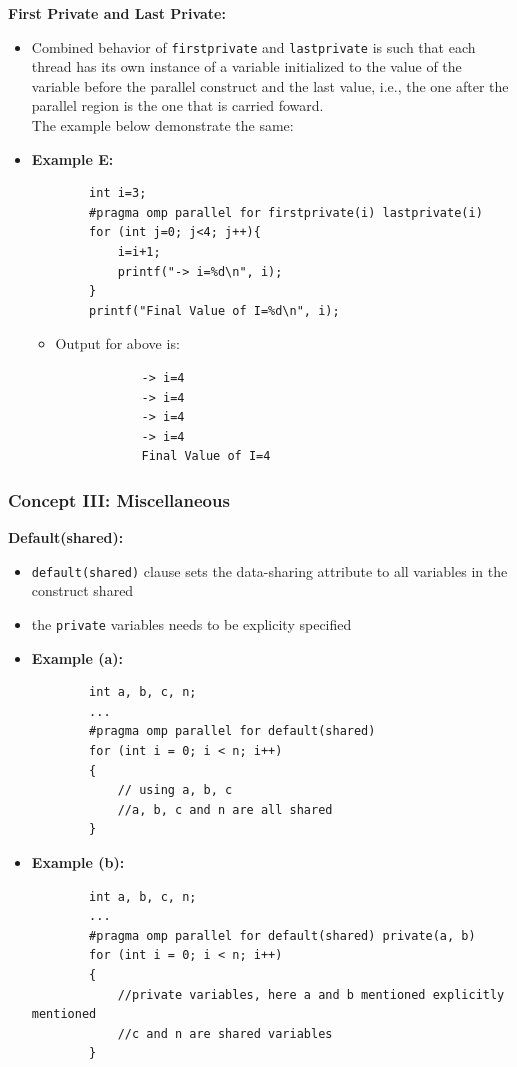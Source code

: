 \documentclass[12pt, a4paper]{report}
\begin{document}
{\bfseries{First Private and Last Private:}}
\begin{itemize}
    \item Combined behavior of \verb$firstprivate$ and \verb$lastprivate$ is such that each thread has its own instance of a variable initialized
          to the value of the variable before the parallel construct and the last value, i.e., the one after the parallel region is the one that 
          is carried foward.\\
          The example below demonstrate the same:
    \item {\bfseries{Example E:}}
    \begin{verbatim}
        int i=3;
        #pragma omp parallel for firstprivate(i) lastprivate(i)
        for (int j=0; j<4; j++){ 
            i=i+1;
            printf("-> i=%d\n", i); 
        }
        printf("Final Value of I=%d\n", i);
    \end{verbatim}
    \begin{itemize}
        \item Output for above is:
        \begin{verbatim}
            -> i=4
            -> i=4
            -> i=4
            -> i=4
            Final Value of I=4
        \end{verbatim}
    \end{itemize}
\end{itemize}

\subsubsection{Concept III: Miscellaneous}
{\bfseries{Default(shared):}}
\begin{itemize}
    \item \verb$default(shared)$ clause sets the data-sharing attribute to all variables in the construct shared
    \item the \verb$private$ variables needs to be explicity specified
    \item {\bfseries{Example (a):}}
    \begin{verbatim}
        int a, b, c, n;
        ...
        #pragma omp parallel for default(shared) 
        for (int i = 0; i < n; i++)
        {
            // using a, b, c
            //a, b, c and n are all shared
        }
    \end{verbatim}
    \item {\bfseries{Example (b):}}
    \begin{verbatim}
        int a, b, c, n;
        ...
        #pragma omp parallel for default(shared) private(a, b)
        for (int i = 0; i < n; i++)
        {
            //private variables, here a and b mentioned explicitly mentioned
            //c and n are shared variables
        }
    \end{verbatim}
\end{itemize}
\end{document}
